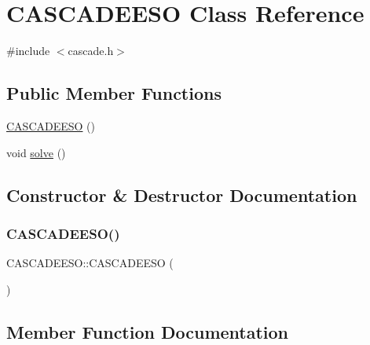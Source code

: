 \hypertarget{class_c_a_s_c_a_d_e_e_s_o}{}\section{C\+A\+S\+C\+A\+D\+E\+E\+SO Class Reference}
\label{class_c_a_s_c_a_d_e_e_s_o}


{\ttfamily \#include $<$cascade.\+h$>$}

\subsection*{Public Member Functions}
\begin{DoxyCompactItemize}
\item 
\mbox{\hyperlink{class_c_a_s_c_a_d_e_e_s_o_a602657637f64c2c16d9b2141165afc11}{C\+A\+S\+C\+A\+D\+E\+E\+SO}} ()
\item 
void \mbox{\hyperlink{class_c_a_s_c_a_d_e_e_s_o_a87ddbb1f74cbb26db6dafa7d780ed7e9}{solve}} ()
\end{DoxyCompactItemize}


\subsection{Constructor \& Destructor Documentation}
\mbox{\label{class_c_a_s_c_a_d_e_e_s_o_a602657637f64c2c16d9b2141165afc11}} 
\subsubsection{\texorpdfstring{C\+A\+S\+C\+A\+D\+E\+E\+S\+O()}{CASCADEESO()}}
{\footnotesize\ttfamily C\+A\+S\+C\+A\+D\+E\+E\+S\+O\+::\+C\+A\+S\+C\+A\+D\+E\+E\+SO (\begin{DoxyParamCaption}{ }\end{DoxyParamCaption})\hspace{0.3cm}{\ttfamily [inline]}}



\subsection{Member Function Documentation}
\mbox{\label{class_c_a_s_c_a_d_e_e_s_o_a87ddbb1f74cbb26db6dafa7d780ed7e9}} 

